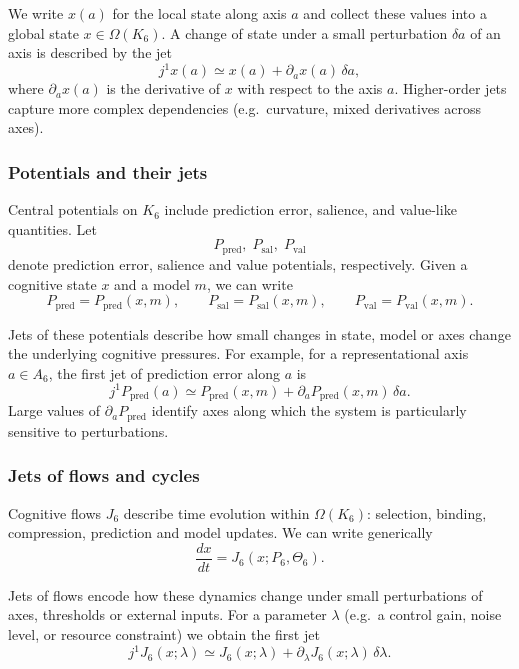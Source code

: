 We write $x(a)$ for the local state along axis $a$ and collect
these values into a global state $x \in \Omega(K_6)$.  A change of
state under a small perturbation $\delta a$ of an axis is described
by the jet
\[
  j^1 x(a) \simeq x(a) + \partial_a x(a)\,\delta a,
\]
where $\partial_a x(a)$ is the derivative of $x$ with respect to
the axis $a$.  Higher-order jets capture more complex dependencies
(e.g.\ curvature, mixed derivatives across axes).


\subsubsection{Potentials and their jets}

Central potentials on $K_6$ include prediction error, salience,
and value-like quantities.  Let
\[
  P_{\mathrm{pred}},\; P_{\mathrm{sal}},\; P_{\mathrm{val}}
\]
denote prediction error, salience and value potentials,
respectively.  Given a cognitive state $x$ and a model $m$,
we can write
\[
  P_{\mathrm{pred}} = P_{\mathrm{pred}}(x, m), \qquad
  P_{\mathrm{sal}}  = P_{\mathrm{sal}}(x, m), \qquad
  P_{\mathrm{val}}  = P_{\mathrm{val}}(x, m).
\]

Jets of these potentials describe how small changes in
state, model or axes change the underlying cognitive
pressures.  For example, for a representational axis $a \in A_6$,
the first jet of prediction error along $a$ is
\[
  j^1 P_{\mathrm{pred}}(a)
  \simeq P_{\mathrm{pred}}(x, m)
        + \partial_{a} P_{\mathrm{pred}}(x, m)\,\delta a.
\]
Large values of $\partial_{a} P_{\mathrm{pred}}$ identify axes
along which the system is particularly sensitive to perturbations.


\subsubsection{Jets of flows and cycles}

Cognitive flows $J_6$ describe time evolution within $\Omega(K_6)$:
selection, binding, compression, prediction and model updates.
We can write generically
\[
  \frac{dx}{dt} = J_6(x; P_6, \Theta_6).
\]

Jets of flows encode how these dynamics change under small
perturbations of axes, thresholds or external inputs.  For a
parameter $\lambda$ (e.g.\ a control gain, noise level, or
resource constraint) we obtain the first jet
\[
  j^1 J_6(x;\lambda)
  \simeq J_6(x;\lambda)
        + \partial_{\lambda} J_6(x;\lambda)\,\delta\lambda.
\]

